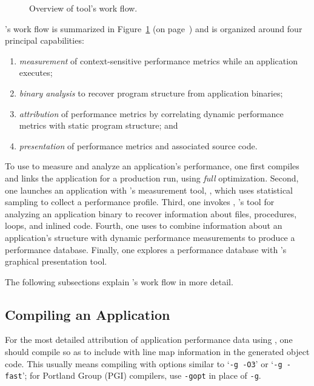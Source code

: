 \documentclass[11pt,letterpaper]{report}
\begin{document}
\begin{figure}[t]
\caption{Overview of \HPCToolkit{} tool's work flow.}
\label{fig:hpctoolkit-overview:b}
\end{figure}

\HPCToolkit{}'s work flow is summarized in Figure~\ref{fig:hpctoolkit-overview:b} (on page~\pageref{fig:hpctoolkit-overview:b}) and is organized around four principal capabilities:
\begin{enumerate}
  \item \emph{measurement} of context-sensitive performance metrics while an application executes;
  \item \emph{binary analysis} to recover program structure from application binaries;
  \item \emph{attribution} of performance metrics by correlating dynamic performance metrics with static program structure; and
  \item \emph{presentation} of performance metrics and associated source code.
\end{enumerate}

To use \HPCToolkit{} to measure and analyze an application's performance, one first compiles and links the application for a production run, using \emph{full} optimization.
Second, one launches an application with \HPCToolkit{}'s measurement tool, \hpcrun{}, which uses statistical sampling to collect a performance profile.
Third, one invokes \hpcstruct{}, \HPCToolkit{}'s tool for analyzing an application binary to recover information about files, procedures, loops, and inlined code.
Fourth, one uses \hpcprof{} to combine information about an application's structure with dynamic performance measurements to produce a performance database.
Finally, one explores a performance database with \HPCToolkit{}'s \hpcviewer{} graphical presentation tool.

The following subsections explain \HPCToolkit{}'s work flow in more detail.



\subsection{Compiling an Application}

For the most detailed attribution of application performance data using \HPCToolkit{}, one should compile so as to include with line map information in the generated object code.
This usually means compiling with options similar to `\texttt{-g -O3}' or `\texttt{-g -fast}'; for Portland Group (PGI) compilers, use \texttt{-gopt} in place of \texttt{-g}.
\end{document}
